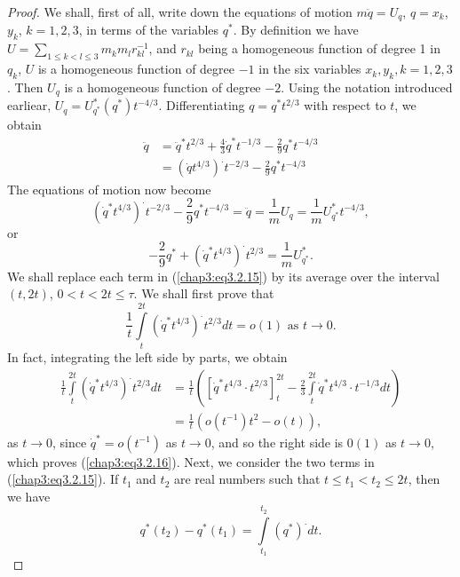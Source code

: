 \begin{proof}
  We shall, first of all, write down the equations of motion
  $m\ddot{q} = U_q$, $q = x_k$, $y_k$, $k = 1,2,3$, in terms of the
  variables  $q^*$. By definition we have $U = \sum\limits_{1 \leq k <
    l \leq 3} m_k m_l r^{-1}_{kl}$, and $r_{kl}$ being a homogeneous
  function of degree 1 in $q_k$, $U$ is a homogeneous function of
  degree $-1$ in the six variables $x_k, y_k, k = 1,2,3$. Then $U_q$
  is a homogeneous function of degree $-2$. Using the notation
  introduced earliear, $U_q = U^*_{q^*} (q^*)
  t^{-4/3}$. Differentiating $q = q^* t^{2/3}$ with respect to $t$, we
  obtain 
\begin{align*}
\ddot{q} & = \ddot{q}^* t^{2/3} + \frac{4}{3} \dot{q}^* t^{-1/3} -
\frac{2}{9} q^* t^{-4/3} \\ 
& = (\dot{q} t^{4/3})^. t^{-2/3} - \frac{2}{9} q^* t^{-4/3}
\tag{3.2.14}\label{chap3:eq3.2.14} 
\end{align*}\pageoriginale
The equations of motion now become
$$
(\dot{q}^* t^{4/3})^. t^{-2/3} - \frac{2}{9} q^* t^{-4/3} = \ddot{q} =
\frac{1}{m} U_q = \frac{1}{m} U^*_{q^*} t^{-4/3}, 
$$
or
\begin{equation*}
-\frac{2}{9} q^* + (\dot{q}^* t^{4/3})^. t^{2/3} = \frac{1}{m}
U^{*}_{q^*}. \tag{3.2.15}\label{chap3:eq3.2.15} 
\end{equation*}
We shall replace each term in (\ref{chap3:eq3.2.15}) by its average
over the  interval $(t, 2t)$, $0 < t < 2t \leq \tau$. We shall first
prove that  
\begin{equation*}
\frac{1}{t} \int\limits^{2t}_t (\dot{q}^* t^{4/3})^. t^{2/3} dt = o(1)
\text{ as } t \to 0.  
\tag{3.2.16}\label{chap3:eq3.2.16}
\end{equation*}
In fact, integrating the left side by parts, we obtain 
\begin{align*}
\frac{1}{t} \int\limits^{2t}_t (\dot{q}^* t^{4/3})^. t^{2/3}  dt & =
\frac{1}{t} \left(\left[\dot{q}^* t^{4/3} \cdot t^{2/3} \right]^{2t}_t
- \frac{2}{3} \int\limits^{2t}_t \dot{q}^* t^{4/3} \cdot t^{-1/3} dt
\right)\\ 
& = \frac{1}{t} (o(t^{-1}) t^2 - o (t)),
\end{align*}
as $t \to 0$, since $\dot{q}^* = o (t^{-1})$ as $t \to 0$, and so the
right side is $0(1)$ as $t \to 0$, which proves
(\ref{chap3:eq3.2.16}). Next, we consider the two terms in
(\ref{chap3:eq3.2.15}). If $t_1$ and $t_2$ are real numbers such that
$t \leq t_1 < t_2 \leq 2t$, then we have  
$$
q^* (t_2) - q^* (t_1) = \int\limits^{t_2}_{t_1} (q^*)^. dt. 
$$
\end{proof}
